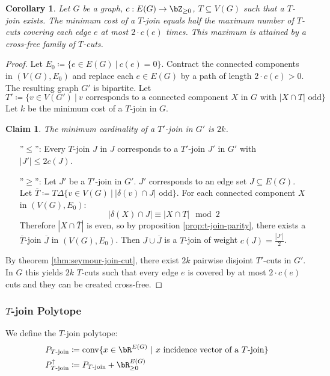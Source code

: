 \documentclass[11pt, a4paper]{article}
\renewcommand{\bar}[1]{\overline{#1}}
\newcommand{\abs}[1]{\left\lvert#1\right\rvert}
\newcommand{\set}[1]{\{#1\}}
\newtheorem{cor}[theorem]{Corollary}
\newtheorem*{claim}{Claim}
\theoremstyle{remark}
\theoremstyle{definition}
\begin{document}
\begin{cor}\label{cor:seymour-join-cut}
	Let $G$ be a graph, $c: E(G)\to\bZ_{\geq0}$, $T\subseteq V(G)$ such that
	a $T$-join exists. The minimum cost of a $T$-join equals half the maximum
	number of $T$-cuts covering each edge $e$ at most $2\cdot c(e)$ times.
	This maximum is attained by a cross-free family of $T$-cuts.
\end{cor}
\begin{proof}
	Let $E_0\coloneqq \set{e\in E(G)\ |\ c(e)=0}$. Contract the connected
	components in $(V(G),E_0)$ and replace each $e\in E(G)$ by a path of
	length $2\cdot c(e)>0$. The resulting graph $G'$ is bipartite. Let
	\[T'\coloneqq \set{v\in V(G')\ |\ v\text{ corresponds to a connected
				component $X$ in $G$ with $\abs{X\cap T}$ odd}}\]
	Let $k$ be the minimum cost of a $T$-join in $G$.
	\begin{claim}
		The minimum cardinality of a $T'$-join in $G'$ is $2k$.
	\end{claim}
	\begin{enumerate}
		\item[''$\leq$'':]
		Every $T$-join $J$ in $J$ corresponds to a $T'$-join
		$J'$ in $G'$ with $\abs{J'}\leq 2c(J)$.

		\item[''$\geq$'':]
		Let $J'$ be a $T'$-join in $G'$. $J'$ corresponds to an edge set
		$J\subseteq E(G)$. Let $\bar T\coloneqq T\Delta\set{v\in V(G)\ |\
				\abs{\delta(v)\cap J}\text{ odd}}$. For each connected component
		$X$ in $(V(G),E_0)$:
		\[\abs{\delta(X)\cap J}\equiv\abs{X\cap T}\mod 2\]
		Therefore $\abs{X\cap \bar T}$ is even, so by proposition
		\ref{prop:t-join-parity}, there exists a $\bar T$-join $\bar J$ in
		$(V(G),E_0)$. Then $J\cup \bar J$ is a $T$-join of weight
		$c(J)=\frac{\abs{J'}}{2}$.
	\end{enumerate}
	By theorem \ref{thm:seymour-join-cut}, there exist $2k$ pairwise
	disjoint $T'$-cuts in $G'$. In $G$ this yields $2k$ $T$-cuts such that
	every edge $e$ is covered by at most $2\cdot c(e)$ cuts and they can
	be created cross-free.
\end{proof}

\subsubsection{\texorpdfstring{$T$}{T}-join Polytope}
We define the $T$-join polytope:
\begin{align*}
	P_{T\text{-join}}          & \coloneqq \mathrm{conv}\set{x\in \bR^{E(G)}
	\ |\ x\text{ incidence vector of a $T$-join}}                               \\
	P^\uparrow_{T\text{-join}} & \coloneqq P_{T\text{-join}}+\bR^{E(G)}_{\geq0}
\end{align*}
\end{document}
